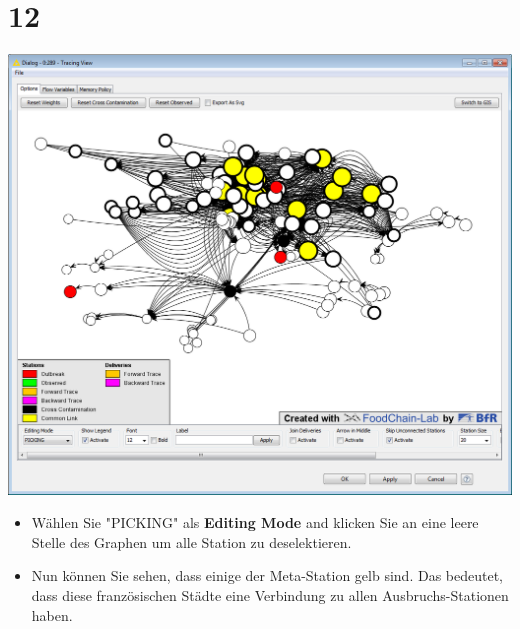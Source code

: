 \documentclass{beamer}
\begin{document}
\section{12}
\begin{frame}
	\begin{center}
  		\includegraphics[height=0.6\textheight]{12.png}
	\end{center}
	\begin{itemize}
		\item Wählen Sie "PICKING" als \textbf{Editing Mode} and klicken Sie an eine leere Stelle des Graphen um alle Station zu deselektieren.
		\item Nun können Sie sehen, dass einige der Meta-Station gelb sind. Das bedeutet, dass diese französischen Städte eine Verbindung zu allen Ausbruchs-Stationen haben.
	\end{itemize}
\end{frame}
\end{document}
